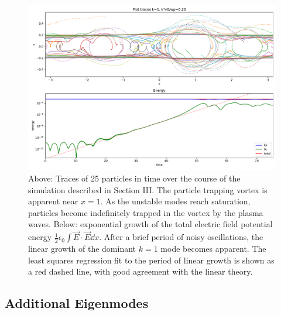 \documentclass[%
 reprint,
 amsmath,amssymb,
 aps,
]{revtex4-2}
\begin{document}
\begin{figure}
\includegraphics[width=0.9\linewidth]{proj3/two-stream-traces-k=1.pdf}
\caption{\label{fig:two-stream-k=1-energy}Above: Traces of 25 particles in time over the course of the simulation described in Section III. The particle trapping vortex is apparent near $x = 1$. As the unstable modes reach saturation, particles become indefinitely trapped in the vortex by the plasma waves. Below: exponential growth of the total electric field potential energy $\frac{1}{2} \epsilon_0 \int \vec E \cdot \vec E \dd x$. After a brief period of noisy oscillations, the linear growth of the dominant $k=1$ mode becomes apparent. The least squares regression fit to the period of linear growth is shown as a red dashed line, with good agreement with the linear theory.}
\end{figure}

\subsection{Additional Eigenmodes}
\end{document}
